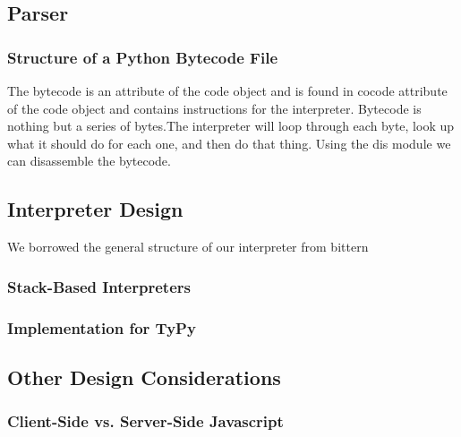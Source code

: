 \documentclass[10pt,a4paper]{article}
\begin{document}
\subsection{Parser}

\subsubsection{Structure of a Python Bytecode File}
The bytecode is an attribute of the code object and is found in cocode attribute of the code object and contains instructions for the interpreter. Bytecode is nothing but a series of bytes.The interpreter will loop through each byte, look up what it should do for each one, and then do that thing. Using the dis module we can disassemble the bytecode.



\subsection{Interpreter Design}
We borrowed the general structure of our interpreter from bittern


\subsubsection{Stack-Based Interpreters} 

\subsubsection{Implementation for TyPy}

\subsection{Other Design Considerations}
\subsubsection{Client-Side vs. Server-Side Javascript}
\end{document}
